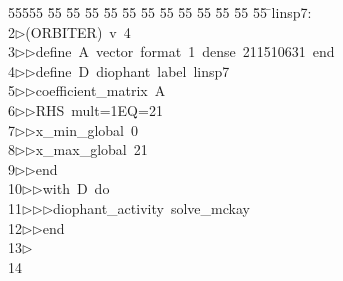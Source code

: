 %
%
\begin{tabbing}
55555 \= 55 \= 55 \= 55 \= 55 \= 55 \= 55 \= 55 \= 55 \= 55 \= 55 \= 55 \= 55 \= \>linsp7:\\[0pt]
2\>$\triangleright$\>(ORBITER)\ v\ 4\ \\[0pt]
3\>$\triangleright$\>$\triangleright$\>define\ A\ vector\ format\ 1\ dense\ 211510631\ end\ \\[0pt]
4\>$\triangleright$\>$\triangleright$\>define\ D\ diophant\ label\ linsp7\ \\[0pt]
5\>$\triangleright$\>$\triangleright$\>coefficient\_matrix\ A\ \\[0pt]
6\>$\triangleright$\>$\triangleright$\>RHS\ mult=1EQ=21\ \\[0pt]
7\>$\triangleright$\>$\triangleright$\>x\_min\_global\ 0\ \\[0pt]
8\>$\triangleright$\>$\triangleright$\>x\_max\_global\ 21\ \\[0pt]
9\>$\triangleright$\>$\triangleright$\>end\ \\[0pt]
10\>$\triangleright$\>$\triangleright$\>with\ D\ do\ \\[0pt]
11\>$\triangleright$\>$\triangleright$\>$\triangleright$\>diophant\_activity\ solve\_mckay\ \\[0pt]
12\>$\triangleright$\>$\triangleright$\>end\\[0pt]
13\>$\triangleright$\>\\[0pt]
14\>\end{tabbing}
